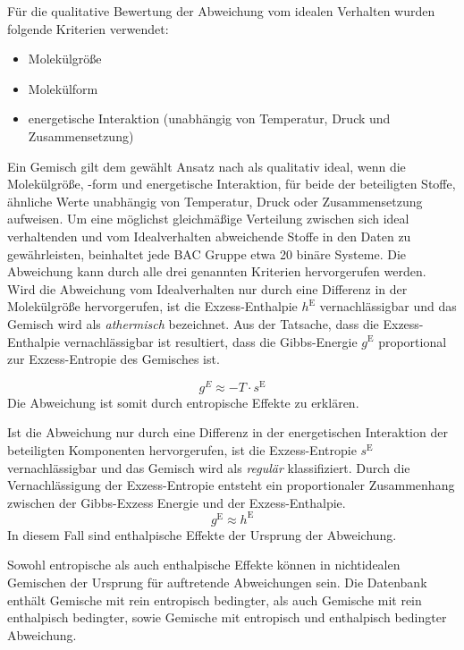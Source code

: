 \documentclass[../thesis.tex]{subfiles}
\begin{document}
Für die qualitative Bewertung der Abweichung vom idealen Verhalten wurden folgende Kriterien verwendet:
\begin{itemize}
	\item Molekülgröße
	\item Molekülform
	\item energetische Interaktion (unabhängig von Temperatur, Druck und Zusammensetzung)
\end{itemize}
Ein Gemisch gilt dem gewählt Ansatz nach als qualitativ ideal, wenn die Molekülgröße, -form und energetische Interaktion, für beide der beteiligten Stoffe, ähnliche Werte unabhängig von Temperatur, Druck oder Zusammensetzung aufweisen.
Um eine möglichst gleichmäßige Verteilung zwischen sich ideal verhaltenden und vom Idealverhalten abweichende Stoffe in den Daten zu gewährleisten, beinhaltet jede BAC Gruppe etwa 20 binäre Systeme.
Die Abweichung kann durch alle drei genannten Kriterien hervorgerufen werden. Wird die Abweichung vom Idealverhalten nur durch eine Differenz in der Molekülgröße hervorgerufen, ist die Exzess-Enthalpie $h^{\mathrm{E}}$ vernachlässigbar und das Gemisch wird als \textit{athermisch} bezeichnet. Aus der Tatsache, dass die Exzess-Enthalpie vernachlässigbar ist resultiert, dass die Gibbs-Energie $g^{\mathrm{E}}$ proportional zur Exzess-Entropie des Gemisches ist.

\begin{equation}
	g^E \approx - T \cdot s^{\mathrm{E}}
\end{equation}   
Die Abweichung ist somit durch entropische Effekte zu erklären.

Ist die Abweichung nur durch eine Differenz in der energetischen Interaktion der beteiligten Komponenten hervorgerufen, ist die Exzess-Entropie $s^{\mathrm{E}}$ vernachlässigbar und das Gemisch wird als \textit{regulär} klassifiziert. Durch die Vernachlässigung der Exzess-Entropie entsteht ein proportionaler Zusammenhang zwischen der Gibbs-Exzess Energie und der Exzess-Enthalpie.
\begin{equation}
	g^{\mathrm{E}} \approx h^{\mathrm{E}}
\end{equation}
In diesem Fall sind enthalpische Effekte der Ursprung der Abweichung.

Sowohl entropische als auch enthalpische Effekte können in nichtidealen Gemischen der Ursprung für auftretende Abweichungen sein. Die Datenbank enthält Gemische mit rein entropisch bedingter, als auch Gemische mit rein enthalpisch bedingter, sowie Gemische mit entropisch und enthalpisch bedingter Abweichung.
\end{document}
